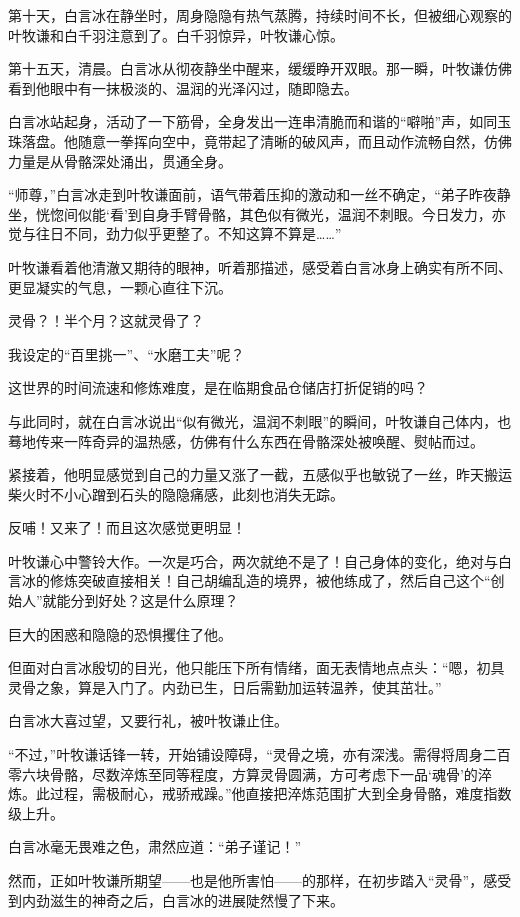 第十天，白言冰在静坐时，周身隐隐有热气蒸腾，持续时间不长，但被细心观察的叶牧谦和白千羽注意到了。白千羽惊异，叶牧谦心惊。

第十五天，清晨。白言冰从彻夜静坐中醒来，缓缓睁开双眼。那一瞬，叶牧谦仿佛看到他眼中有一抹极淡的、温润的光泽闪过，随即隐去。

白言冰站起身，活动了一下筋骨，全身发出一连串清脆而和谐的“噼啪”声，如同玉珠落盘。他随意一拳挥向空中，竟带起了清晰的破风声，而且动作流畅自然，仿佛力量是从骨骼深处涌出，贯通全身。

“师尊，”白言冰走到叶牧谦面前，语气带着压抑的激动和一丝不确定，“弟子昨夜静坐，恍惚间似能‘看’到自身手臂骨骼，其色似有微光，温润不刺眼。今日发力，亦觉与往日不同，劲力似乎更整了。不知这算不算是……”

叶牧谦看着他清澈又期待的眼神，听着那描述，感受着白言冰身上确实有所不同、更显凝实的气息，一颗心直往下沉。

灵骨？！半个月？这就灵骨了？

我设定的“百里挑一”、“水磨工夫”呢？

这世界的时间流速和修炼难度，是在临期食品仓储店打折促销的吗？

与此同时，就在白言冰说出“似有微光，温润不刺眼”的瞬间，叶牧谦自己体内，也蓦地传来一阵奇异的温热感，仿佛有什么东西在骨骼深处被唤醒、熨帖而过。

紧接着，他明显感觉到自己的力量又涨了一截，五感似乎也敏锐了一丝，昨天搬运柴火时不小心蹭到石头的隐隐痛感，此刻也消失无踪。

反哺！又来了！而且这次感觉更明显！

叶牧谦心中警铃大作。一次是巧合，两次就绝不是了！自己身体的变化，绝对与白言冰的修炼突破直接相关！自己胡编乱造的境界，被他练成了，然后自己这个“创始人”就能分到好处？这是什么原理？

巨大的困惑和隐隐的恐惧攫住了他。

但面对白言冰殷切的目光，他只能压下所有情绪，面无表情地点点头：“嗯，初具灵骨之象，算是入门了。内劲已生，日后需勤加运转温养，使其茁壮。”

白言冰大喜过望，又要行礼，被叶牧谦止住。

“不过，”叶牧谦话锋一转，开始铺设障碍，“灵骨之境，亦有深浅。需得将周身二百零六块骨骼，尽数淬炼至同等程度，方算灵骨圆满，方可考虑下一品‘魂骨’的淬炼。此过程，需极耐心，戒骄戒躁。”他直接把淬炼范围扩大到全身骨骼，难度指数级上升。

白言冰毫无畏难之色，肃然应道：“弟子谨记！”

然而，正如叶牧谦所期望——也是他所害怕——的那样，在初步踏入“灵骨”，感受到内劲滋生的神奇之后，白言冰的进展陡然慢了下来。

